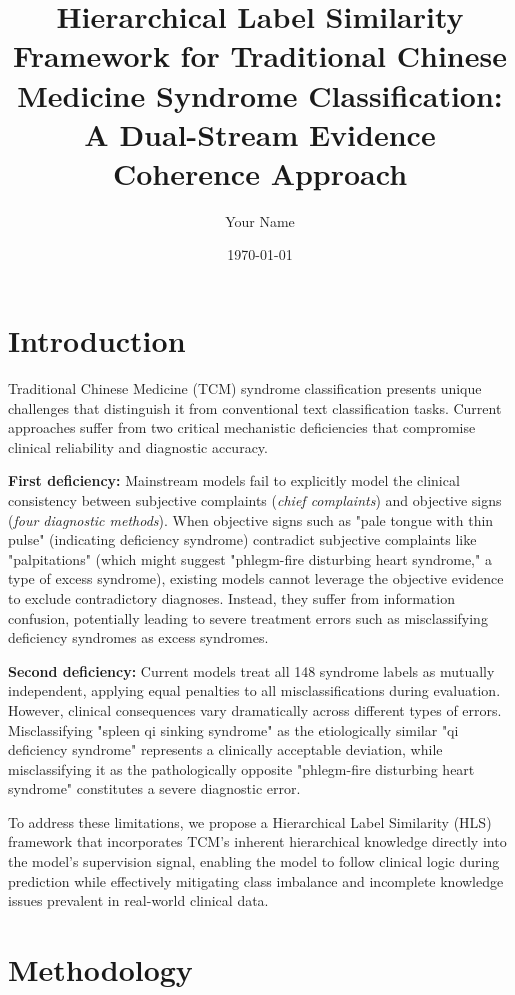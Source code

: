 \documentclass{article}
\title{Hierarchical Label Similarity Framework for Traditional Chinese Medicine Syndrome Classification: A Dual-Stream Evidence Coherence Approach}
\author{Your Name}
\date{\today}
\begin{document}
\maketitle

\section{Introduction}

Traditional Chinese Medicine (TCM) syndrome classification presents unique challenges that distinguish it from conventional text classification tasks. Current approaches suffer from two critical mechanistic deficiencies that compromise clinical reliability and diagnostic accuracy.

\textbf{First deficiency:} Mainstream models fail to explicitly model the clinical consistency between subjective complaints (\textit{chief complaints}) and objective signs (\textit{four diagnostic methods}). When objective signs such as "pale tongue with thin pulse" (indicating deficiency syndrome) contradict subjective complaints like "palpitations" (which might suggest "phlegm-fire disturbing heart syndrome," a type of excess syndrome), existing models cannot leverage the objective evidence to exclude contradictory diagnoses. Instead, they suffer from information confusion, potentially leading to severe treatment errors such as misclassifying deficiency syndromes as excess syndromes.

\textbf{Second deficiency:} Current models treat all 148 syndrome labels as mutually independent, applying equal penalties to all misclassifications during evaluation. However, clinical consequences vary dramatically across different types of errors. Misclassifying "spleen qi sinking syndrome" as the etiologically similar "qi deficiency syndrome" represents a clinically acceptable deviation, while misclassifying it as the pathologically opposite "phlegm-fire disturbing heart syndrome" constitutes a severe diagnostic error.

To address these limitations, we propose a Hierarchical Label Similarity (HLS) framework that incorporates TCM's inherent hierarchical knowledge directly into the model's supervision signal, enabling the model to follow clinical logic during prediction while effectively mitigating class imbalance and incomplete knowledge issues prevalent in real-world clinical data.

\section{Methodology}
\end{document}
